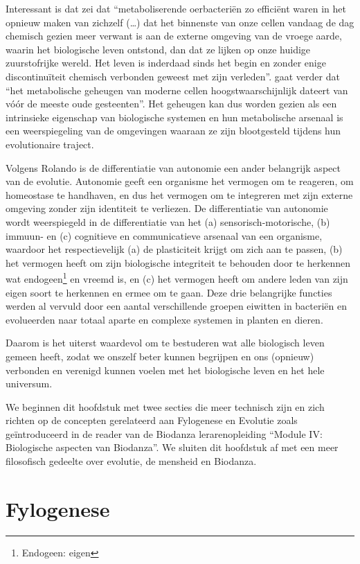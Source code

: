 \documentclass[
  11pt,
]{book}
\begin{document}
Interessant is dat \citet{margulis1999} zei dat ``metaboliserende oerbacteriën zo efficiënt waren in het opnieuw maken van zichzelf (\ldots) dat het binnenste van onze cellen vandaag de dag chemisch gezien meer verwant is aan de externe omgeving van de vroege aarde, waarin het biologische leven ontstond, dan dat ze lijken op onze huidige zuurstofrijke wereld. Het leven is inderdaad sinds het begin en zonder enige discontinuïteit chemisch verbonden geweest met zijn verleden''. \citet{margulis1999} gaat verder dat ``het metabolische geheugen van moderne cellen hoogstwaarschijnlijk dateert van vóór de meeste oude gesteenten''. Het geheugen kan dus worden gezien als een intrinsieke eigenschap van biologische systemen en hun metabolische arsenaal is een weerspiegeling van de omgevingen waaraan ze zijn blootgesteld tijdens hun evolutionaire traject.

Volgens Rolando is de differentiatie van autonomie een ander belangrijk aspect van de evolutie. Autonomie geeft een organisme het vermogen om te reageren, om homeostase te handhaven, en dus het vermogen om te integreren met zijn externe omgeving zonder zijn identiteit te verliezen. De differentiatie van autonomie wordt weerspiegeld in de differentiatie van het (a) sensorisch-motorische, (b) immuun- en (c) cognitieve en communicatieve arsenaal van een organisme, waardoor het respectievelijk (a) de plasticiteit krijgt om zich aan te passen, (b) het vermogen heeft om zijn biologische integriteit te behouden door te herkennen wat endogeen\footnote{Endogeen: eigen} en vreemd is, en (c) het vermogen heeft om andere leden van zijn eigen soort te herkennen en ermee om te gaan. Deze drie belangrijke functies werden al vervuld door een aantal verschillende groepen eiwitten in bacteriën en evolueerden naar totaal aparte en complexe systemen in planten en dieren.

Daarom is het uiterst waardevol om te bestuderen wat alle biologisch leven gemeen heeft, zodat we onszelf beter kunnen begrijpen en ons (opnieuw) verbonden en verenigd kunnen voelen met het biologische leven en het hele universum.

We beginnen dit hoofdstuk met twee secties die meer technisch zijn en zich richten op de concepten gerelateerd aan Fylogenese en Evolutie zoals geïntroduceerd in de reader van de Biodanza lerarenopleiding ``Module IV: Biologische aspecten van Biodanza''. We sluiten dit hoofdstuk af met een meer filosofisch gedeelte over evolutie, de mensheid en Biodanza.

\section{Fylogenese}\label{fylogenese}
\end{document}

